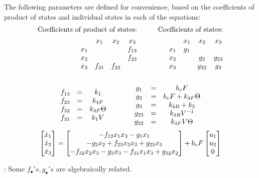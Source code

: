 The following parameters are defined for convenience, based on the coefficients
of product of states and individual states in each of the equations:
\begin{align*}
    \text{Coefficients of product of states:} &\qquad& \text{Coefficients of states:}\\
    \begin{matrix}    & x_1    & x_2      & x_3    \\
        x_1 &        &          & f_{13} \\
        x_2 &        &          & f_{23} \\
        x_3 & f_{31} & f_{32}   & \end{matrix}
    &\qquad &
    \begin{matrix}     & x_1    & x_2      & x_3    \\
        x_1  & g_1    &          &        \\
        x_2  &        & g_{2}    & g_{23} \\
        x_3  &        & g_{32}   & g_{3} \end{matrix}
\end{align*}
\begin{align*}
    \begin{matrix} 
    \\f_{13} &=& k_1
    \\f_{23} &=& k_{4F}
    \\f_{32} &=& k_{4F} \Theta
    \\f_{31} &=& k_1 V
     \end{matrix}
    \qquad \qquad
    \begin{matrix} 
    \\ g_1    &=& b_v F
    \\ g_2    &=& b_v F + k_{4F} \Theta
    \\ g_{3}  &=& k_{4R}+k_3
    \\ g_{23} &=& k_{4R} V^{-1}
    \\ g_{32} &=& k_{4F} V \Theta
     \end{matrix}
\end{align*}
\begin{equation}\label{eqn::parm_model_M}
     \begin{bmatrix} \dot x_1 \\
        \dot x_2\\
        \dot x_3\\
         \end{bmatrix} =
    \begin{bmatrix} 
        -f_{12} x_1 x_3
        -g_1 x_1
        \\
        -g_2 x_2
        + f_{23} x_2 x_3
        + g_{23} x_3
        \\
        -f_{32} x_2 x_3
        -g_3 x_3
        -f_{31} x_1 x_3
        + g_{32} x_2
     \end{bmatrix}
    + b_v F \begin{bmatrix} u_1 \\ u_2 \\ 0 \end{bmatrix}
\end{equation}

: Some $f_{\bullet}'s, g_{\bullet}'s$ are algebraically related.


